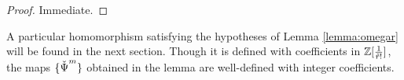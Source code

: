 \begin{proof}
	Immediate.
\end{proof}

\begin{remark}
	A particular homomorphism satisfying the hypotheses of Lemma \ref{lemma:omegar} will be found in the next section. Though it is defined with coefficients in $\mathbb{Z}[\frac{1}{\tilde{r}!}]$, the maps $\{\operatorname{\check{\Psi}}^m\}$ obtained in the lemma are well-defined with integer coefficients.
\end{remark}